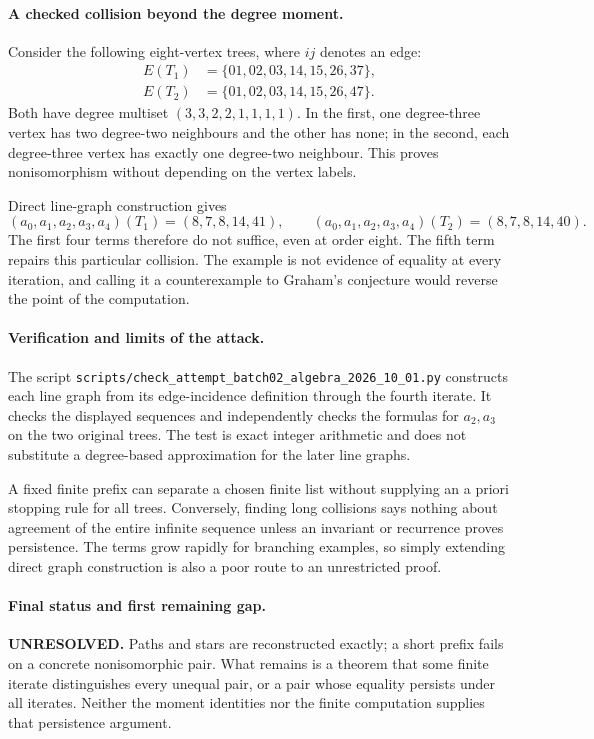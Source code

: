 \documentclass[11pt,a4paper]{article}
\begin{document}
\paragraph{A checked collision beyond the degree moment.}
Consider the following eight-vertex trees, where $ij$ denotes an edge:
\[
 \begin{split}
 E(T_1)&=\{01,02,03,14,15,26,37\},\\
 E(T_2)&=\{01,02,03,14,15,26,47\}.
 \end{split}
\]
Both have degree multiset $(3,3,2,2,1,1,1,1)$. In the first, one
degree-three vertex has two degree-two neighbours and the other has
none; in the second, each degree-three vertex has exactly one
degree-two neighbour. This proves nonisomorphism without depending on
the vertex labels.

Direct line-graph construction gives
\[
 (a_0,a_1,a_2,a_3,a_4)(T_1)=(8,7,8,14,41),\qquad
 (a_0,a_1,a_2,a_3,a_4)(T_2)=(8,7,8,14,40).
\]
The first four terms therefore do not suffice, even at order eight.
The fifth term repairs this particular collision. The example is not
evidence of equality at every iteration, and calling it a counterexample
to Graham's conjecture would reverse the point of the computation.

\paragraph{Verification and limits of the attack.}
The script \texttt{scripts/check\_attempt\_batch02\_algebra\_2026\_10\_01.py}
constructs each line graph from its edge-incidence definition through
the fourth iterate. It checks the displayed sequences and independently
checks the formulas for $a_2,a_3$ on the two original trees. The test is
exact integer arithmetic and does not substitute a degree-based
approximation for the later line graphs.

A fixed finite prefix can separate a chosen finite list without supplying
an a priori stopping rule for all trees. Conversely, finding long
collisions says nothing about agreement of the entire infinite sequence
unless an invariant or recurrence proves persistence. The terms grow
rapidly for branching examples, so simply extending direct graph
construction is also a poor route to an unrestricted proof.

\paragraph{Final status and first remaining gap.}
\textbf{UNRESOLVED.} Paths and stars are reconstructed exactly; a short
prefix fails on a concrete nonisomorphic pair. What remains is a theorem
that some finite iterate distinguishes every unequal pair, or a pair
whose equality persists under all iterates. Neither the moment identities
nor the finite computation supplies that persistence argument.
\end{document}
